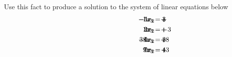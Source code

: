 \documentclass[basic]{inVerba-notes}
\begin{document}
\begin{enumerate}[align=left, leftmargin=0pt, labelindent=\parindent, listparindent=\parindent, labelwidth=0pt, itemindent=!]
  \medskip

  Use this fact to produce a solution to the system of linear equations below
  \begin{align*}
    \hspace{80pt} -5x_1 &\quad+ \hspace{-50pt}& -4x_2 &\quad+ \hspace{-50pt}& 1x_3 &= 3 \\
    \hspace{80pt} 3x_1 &\quad+ \hspace{-50pt}& 2x_2  &\quad+ \hspace{-50pt}& 1x_3 &= -3 \\
    \hspace{80pt} -4x_1 &\quad+ \hspace{-50pt}& 0x_2 &\quad+ \hspace{-50pt}& 3 8x_3 &= 28 \\
    \hspace{80pt} 7x_1 &\quad+ \hspace{-50pt}& 0x_2  &\quad+ \hspace{-50pt}& 9x_3 &= 43 
  \end{align*}
\end{enumerate}
\end{document}
